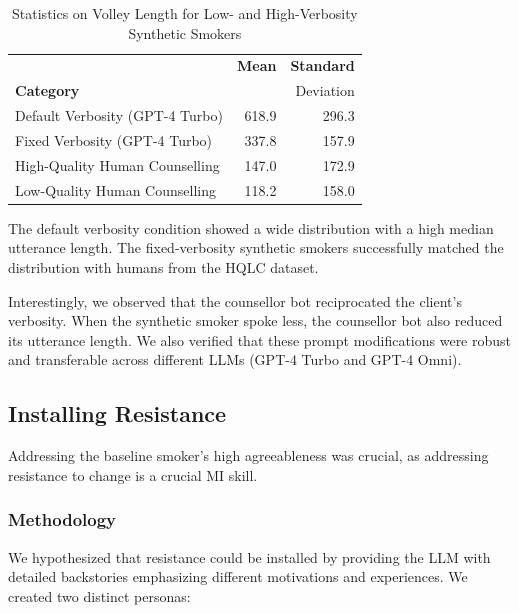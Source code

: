 \begin{table}[ht]
\centering

\begin{tabular}{lrr}
\toprule
{} &  \textbf{Mean} &  \textbf{Standard} \\
\textbf{Category}                   &                        &           {Deviation}          \\
\midrule
Default Verbosity (GPT-4 Turbo) &                  618.9 &               296.3 \\
Fixed Verbosity (GPT-4 Turbo)   &                  337.8 &               157.9 \\
High-Quality Human Counselling             &                  147.0 &               172.9 \\
Low-Quality Human Counselling            &                  118.2 &               158.0 \\
\bottomrule
\end{tabular}
\caption{Statistics on Volley Length for Low- and High-Verbosity Synthetic Smokers}
\label{tab:utterance_stats}
\end{table}

The default verbosity condition showed a wide distribution with a high median utterance length. The fixed-verbosity synthetic smokers successfully matched the distribution with humans from the HQLC dataset.

Interestingly, we observed that the counsellor bot reciprocated the client's verbosity. When the synthetic smoker spoke less, the counsellor bot also reduced its utterance length. We also verified that these prompt modifications were robust and transferable across different LLMs (GPT-4 Turbo and GPT-4 Omni).

\subsection{Installing Resistance}
\label{sec:synthetic-smoker-resistance}

Addressing the baseline smoker's high agreeableness was crucial, as addressing resistance to change is a crucial MI skill.

\subsubsection{Methodology}
We hypothesized that resistance could be installed by providing the LLM with detailed backstories emphasizing different motivations and experiences. We created two distinct personas:

